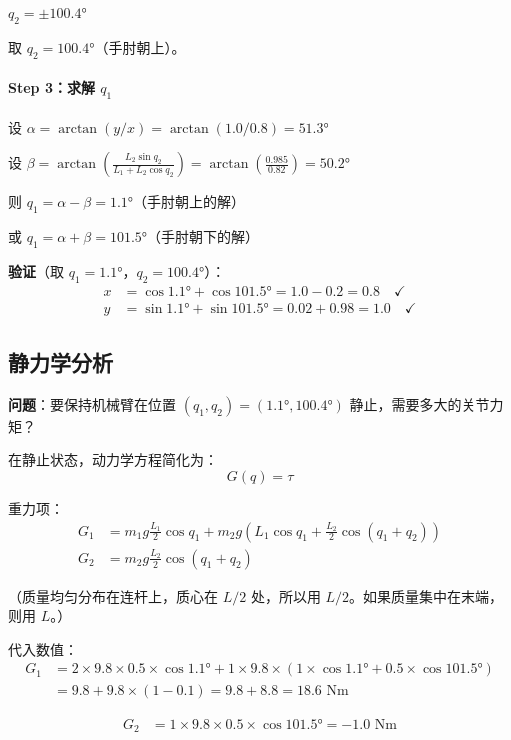 $q_2 = \pm 100.4°$

取 $q_2 = 100.4°$（手肘朝上）。

\paragraph{Step 3：求解 $q_1$}

设 $\alpha = \arctan(y/x) = \arctan(1.0/0.8) = 51.3°$

设 $\beta = \arctan\left(\frac{L_2 \sin q_2}{L_1 + L_2 \cos q_2}\right) = \arctan\left(\frac{0.985}{0.82}\right) = 50.2°$

则 $q_1 = \alpha - \beta = 1.1°$（手肘朝上的解）

或 $q_1 = \alpha + \beta = 101.5°$（手肘朝下的解）

\textbf{验证}（取 $q_1 = 1.1°$，$q_2 = 100.4°$）：
\begin{align}
x &= \cos 1.1° + \cos 101.5° = 1.0 - 0.2 = 0.8 \quad \checkmark \\
y &= \sin 1.1° + \sin 101.5° = 0.02 + 0.98 = 1.0 \quad \checkmark
\end{align}

\subsection{静力学分析}

\textbf{问题}：要保持机械臂在位置 $(q_1, q_2) = (1.1°, 100.4°)$ 静止，需要多大的关节力矩？

在静止状态，动力学方程简化为：
\[
G(q) = \tau
\]

重力项：
\begin{align}
G_1 &= m_1 g \frac{L_1}{2} \cos q_1 + m_2 g (L_1 \cos q_1 + \frac{L_2}{2} \cos(q_1+q_2)) \\
G_2 &= m_2 g \frac{L_2}{2} \cos(q_1+q_2)
\end{align}

（质量均匀分布在连杆上，质心在 $L/2$ 处，所以用 $L/2$。如果质量集中在末端，则用 $L$。）

代入数值：
\begin{align}
G_1 &= 2 \times 9.8 \times 0.5 \times \cos 1.1° + 1 \times 9.8 \times (1 \times \cos 1.1° + 0.5 \times \cos 101.5°) \\
&= 9.8 + 9.8 \times (1 - 0.1) = 9.8 + 8.8 = 18.6 \text{ Nm}
\end{align}

\begin{align}
G_2 &= 1 \times 9.8 \times 0.5 \times \cos 101.5° = -1.0 \text{ Nm}
\end{align}

